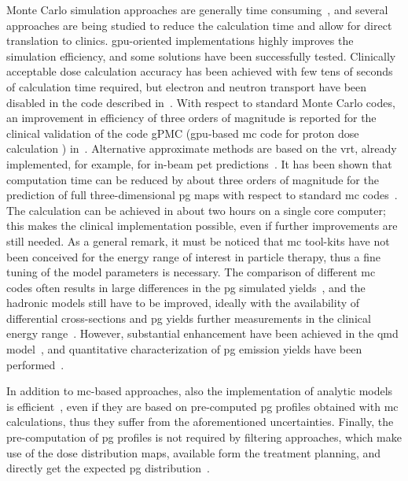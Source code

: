 Monte Carlo simulation approaches are generally time consuming~\parencite{Robert2013, Dedes2015, Schumann2015}, and several approaches are being studied to reduce the calculation time and allow for direct translation to clinics. \gls{gpu}-oriented implementations highly improves the simulation efficiency, and some solutions have been successfully tested. Clinically acceptable dose calculation accuracy has been achieved with few tens of seconds of calculation time required, but electron and neutron transport have been disabled in the code described in~\cite{Qin2017}. With respect to standard Monte Carlo codes, an improvement in efficiency of three orders of magnitude is reported for the clinical validation of the code gPMC (\gls{gpu}-based \gls{mc} code for proton dose calculation ) in~\cite{Giantsoudi2015}. 
Alternative approximate methods are based on the \gls{vrt}, already implemented, for example, for in-beam \gls{pet} predictions~\parencite{Sommerer2009}. It has been shown that computation time can be reduced by about three orders of magnitude for the prediction of full three-dimensional \gls{pg} maps with respect to standard \gls{mc} codes~\parencite{Huisman2016, ElKanawati2015}. The calculation can be achieved in about two hours on a single core computer; this makes the clinical implementation possible, even if further improvements are still needed.  
As a general remark, it must be noticed that \gls{mc} tool-kits have not been conceived for the energy range of interest in particle therapy, thus a fine tuning of the model parameters is necessary. The comparison of different \gls{mc} codes often results in large differences in the \gls{pg} simulated yields~\parencite{Bohlen2010, Verburg2012, Schumann2015}, and the hadronic models still have to be improved, ideally with the availability of differential cross-sections and \gls{pg} yields further measurements in the clinical energy range~\parencite{Newhauser2015}. However, substantial enhancement have been achieved in the \gls{qmd} model~\parencite{Dedes2014}, and quantitative characterization of \gls{pg} emission yields have been performed~\parencite{Schumann2015, Pinto2016}.

In addition to \gls{mc}-based approaches, also the implementation of analytic models is efficient~\parencite{Sterpin2015, Russo2016}, even if they are based on pre-computed \gls{pg} profiles obtained with \gls{mc} calculations, thus they suffer from the aforementioned uncertainties.
Finally, the pre-computation of \gls{pg} profiles is not required by filtering approaches, which make use of the dose distribution maps, available form the treatment planning, and directly get the expected \gls{pg} distribution~\parencite{Kroniger2015}.  
  
